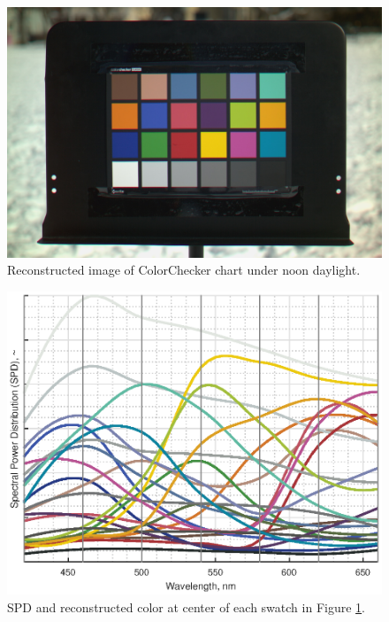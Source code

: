 \documentclass[twocolumn,10pt]{asme2ej}
\begin{document}
\begin{figure}[H]
\begin{centering}
  \includegraphics[height=0.55\linewidth]{colorchecker.jpg}
  \caption{Reconstructed image of ColorChecker chart under noon daylight.}
  \label{colorchecker_mesh}
  \end{centering}
\end{figure}

\begin{figure}[H]
\begin{centering}
  \includegraphics[height=0.6\linewidth]{colorchecker_SPDs.eps}
  \caption{SPD and reconstructed color at center of each swatch in Figure \ref{colorchecker_mesh}.}
  \label{colorchecker_SPDs}
    \end{centering}
\end{figure}

\clearpage
\end{document}

